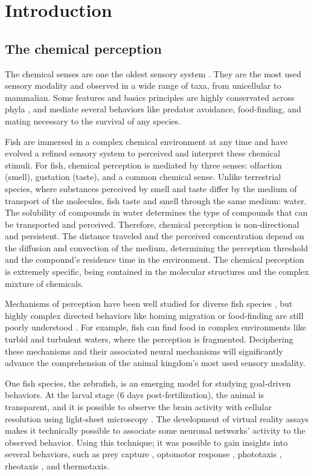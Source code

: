 \chapter{Introduction}

  \section{The chemical perception}
  The chemical senses are one the oldest sensory system \cite{yohe2018evolutionary}. They are the most used sensory modality and observed in a wide range of taxa, from unicellular \cite{bardwell2005walk} to mammalian. Some features and basics principles are highly conservated across phyla \cite{hildebrand1997mechanisms,yarmolinsky2009common}, and mediate several behaviors like predator avoidance, food-finding, and mating necessary to the survival of any species.

  Fish are immersed in a complex chemical environment at any time and have evolved a refined sensory system to perceived and interpret these chemical stimuli. For fish, chemical perception is mediated by three senses: olfaction (smell), gustation (taste), and a common chemical sense. Unlike terrestrial species, where substances perceived by smell and taste differ by the medium of transport of the molecules, fish taste and smell through the same medium: water. The solubility of compounds in water determines the type of compounds that can be transported and perceived. Therefore, chemical perception is non-directional and persistent. The distance traveled and the perceived concentration depend on the diffusion and convection of the medium, determining the perception threshold and the compound's residence time in the environment. The chemical perception is extremely specific, being contained in the molecular structures and the complex mixture of chemicals.

  Mechanisms of perception have been well studied for diverse fish species \cite{hara2012fish}, but highly complex directed behaviors like homing migration or food-finding are still poorly understood \cite{hansen2004chemosensory}. For example, fish can find food in complex environments like turbid and turbulent waters, where the perception is fragmented. Deciphering these mechanisms and their associated neural mechanisms will significantly advance the comprehension of the animal kingdom's most used sensory modality.

  One fish species, the zebrafish, is an emerging model for studying goal-driven behaviors. At the larval stage (6 days post-fertilization), the animal is transparent, and it is possible to observe the brain activity with cellular resolution using light-sheet microscopy \cite{panier2013fast}. The development of virtual reality assays makes it technically possible to associate some neuronal networks' activity to the observed behavior. Using this technique; it was possible to gain insights into several behaviors, such as prey capture \cite{bianco2011prey}, optomotor response \cite{naumann2016whole}, phototaxis \cite{wolf2017sensorimotor}, rheotaxis \cite{olive2016rheotaxis}, and thermotaxis\cite{haesemeyer2019convergent}.

